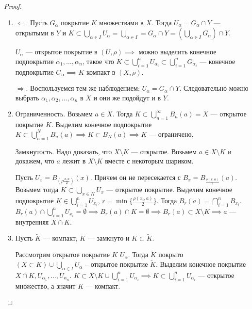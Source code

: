 \begin{proof}
    \begin{enumerate}
        \item $\Leftarrow$. Пусть  $G_\alpha$ покрытие  $K$ множествами в $X$. Тогда  $U_\alpha = G_\alpha \cap Y$ --- открытыми в  $Y$ и $K \subset \bigcup_{\alpha \in I} U_\alpha = \bigcup_{\alpha \in I} = G_\alpha \cap Y = (\bigcup_{\alpha \in I} G_\alpha) \cap Y$.

             $U_\alpha$ --- открытое покрытие в  $(U, \rho) \implies$ можно выделить конечное подпокрытие  $\alpha_1, \ldots, \alpha_n$, такое что $K \subset \bigcup\limits_{i=1}^n U_{\alpha_i} \subset \bigcup\limits_{i=1}^n G_{\alpha_i}$ --- конечное подпокрытие $G_\alpha \implies K$ компакт в  $(X, \rho)$.

              $\Rightarrow$. Воспользуемся тем же наблюдением: $U_\alpha = G_\alpha \cap Y$. Следовательно можно выбрать  $\alpha_1, \alpha_2, \ldots, \alpha_n$ в $X$ и они же подойдут и в  $Y$. 
          \item Ограниченность. Возьмем $a \in X$. Тогда  $K \subset \bigcup\limits_{n=1}^\infty B_n(a) = X$ --- открытое покрытие  $K$. Выделим конечное подпокрытие  $K \subset \bigcup\limits_{n=1}^N B_n(a) \implies K \subset B_N(a) \implies K$ --- ограничено. 

              Замкнутость. Надо доказать, что $X \setminus K$ --- открытое. Возьмем  $a \in X \setminus K$ и докажем, что  $a$ лежит в  $X \setminus K$ вместе с некоторым шариком. 

              Пусть  $U_x = B_{(\rho\frac{x, a}{2})}(x)$. Причем он не пересекается с $B_x = B_{\frac{\rho(x, a)}{2}}(a)$. Возьмем тогда $K \subset \bigcup_{x \in K} U_x$ --- открытое покрытие. Выделим конечное подпокрытие  $K \in \bigcup\limits_{i=1}^n U_{x_i}$,  $r = \min\{\frac{\rho(x_i, a)}{2} \}$. Тогда $B_r(a) = \bigcap\limits_{i=1}^n B_{x_i}$.  $B_r(a) \cap \bigcup\limits_{i=1}^n U_{x_i} = \emptyset \implies B_r(a) \cap K = \emptyset \implies B_r(a) \subset X \setminus K \implies a$ --- внутренняя $X \cap K$. 
          \item Пусть $\widetilde{K}$ --- компакт,  $K$ --- замкнуто и  $K \subset \widetilde{K}$.

              Рассмотрим открытое покрытие  $K$  $U_\alpha$. Тогда  $\widetilde{K}$ покрыто  $(X \subset K) \cup \bigcup\limits_{\alpha \in I} U_\alpha$ -- открытое покрытие  $\widetilde{K}$. Выделим конечное покрытие  $X \cap K, U_{\alpha_1}, \ldots, U_{\alpha_n}$. $K \subset X \setminus K \cup \bigcup\limits_{i=1}^n U_{\alpha_i} \implies K \subset \bigcup\limits_{i=1}^n U_{\alpha_i}$ --- открытое множество, а значит  $K$ --- компакт.
    \end{enumerate}
\end{proof}
